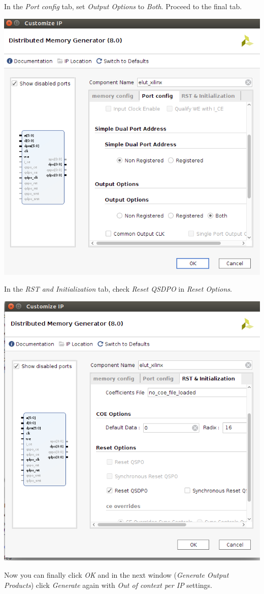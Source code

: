 \documentclass{article}
\begin{document}
\begin{enumerate}
    In the \emph{Port config} tab, set \emph{Output Options} to \emph{Both}. Proceed to the final tab.

    \includegraphics[width=0.7\linewidth]{Figures/vivado14.png}

    In the \emph{RST and Initialization} tab, check \emph{Reset QSDPO} in \emph{Reset Options}.

    \includegraphics[width=0.7\linewidth]{Figures/vivado15.png}

    Now you can finally click \emph{OK} and in the next window (\emph{Generate Output Products}) click \emph{Generate} again with \emph{Out of context per IP} settings. %


\end{enumerate}
\end{document}

